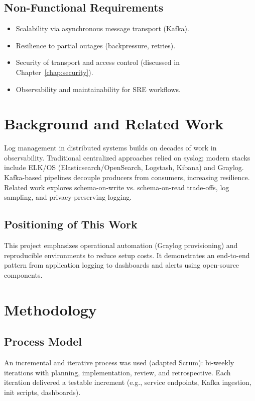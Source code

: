 \documentclass[12pt,a4paper]{report}
\begin{document}
\section{Non-Functional Requirements}
\begin{itemize}[leftmargin=1.2cm]
  \item Scalability via asynchronous message transport (Kafka).
  \item Resilience to partial outages (backpressure, retries).
  \item Security of transport and access control (discussed in Chapter~\ref{chap:security}).
  \item Observability and maintainability for SRE workflows.
\end{itemize}

\chapter{Background and Related Work}
Log management in distributed systems builds on decades of work in observability. Traditional centralized approaches relied on syslog; modern stacks include ELK/OS (Elasticsearch/OpenSearch, Logstash, Kibana) and Graylog. Kafka-based pipelines decouple producers from consumers, increasing resilience. Related work explores schema-on-write vs. schema-on-read trade-offs, log sampling, and privacy-preserving logging.

\section{Positioning of This Work}
This project emphasizes operational automation (Graylog provisioning) and reproducible environments to reduce setup costs. It demonstrates an end-to-end pattern from application logging to dashboards and alerts using open-source components.

\chapter{Methodology}
\section{Process Model}
An incremental and iterative process was used (adapted Scrum): bi-weekly iterations with planning, implementation, review, and retrospective. Each iteration delivered a testable increment (e.g., service endpoints, Kafka ingestion, init scripts, dashboards).
\end{document}
